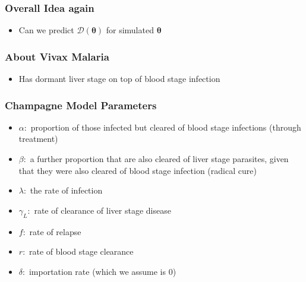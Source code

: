 \documentclass{beamer}
\begin{document}
\begin{frame}
    \frametitle{Overall Idea again}
    \begin{itemize}
        \item Can we predict $\mathcal{D}(\bm{\theta})$ for simulated $\bm{\theta}$
    \end{itemize}
\end{frame}

\begin{frame}
    \frametitle{About Vivax Malaria}
    \begin{itemize}
        \item Has dormant liver stage on top of blood stage infection
    \end{itemize}
\end{frame}

\begin{frame}
    \frametitle{Champagne Model Parameters}\begin{itemize}
        \item $\alpha:$ proportion of those infected but cleared of blood stage infections (through treatment)
        \item $\beta:$ a further proportion that are also cleared of liver stage parasites, given that they were also cleared of blood stage infection (radical cure)
        \item $\lambda:$ the rate of infection
        \item $\gamma_L:$ rate of clearance of liver stage disease
        \item $f:$ rate of relapse
        \item $r:$ rate of blood stage clearance
        \item $\delta:$ importation rate (which we assume is 0)
    \end{itemize}

\end{frame}
\end{document}
